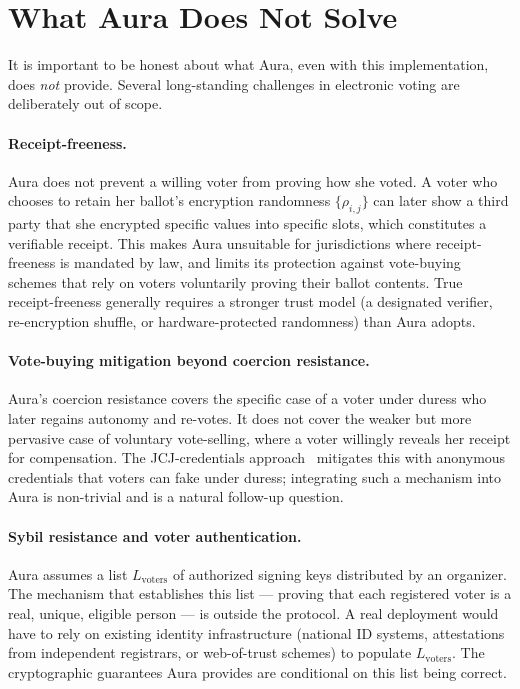 \documentclass[12pt,a4paper,oneside]{report}
\begin{document}
\section{What Aura Does Not Solve}
\label{sec:limits}

It is important to be honest about what Aura, even with this 
implementation, does \emph{not} provide. Several long-standing 
challenges in electronic voting are deliberately out of scope.

\paragraph{Receipt-freeness.} 
Aura does not prevent a willing voter from proving how she voted. A 
voter who chooses to retain her ballot's encryption randomness 
$\{\rho_{i, j}\}$ can later show a third party that she encrypted 
specific values into specific slots, which constitutes a verifiable 
receipt. This makes Aura unsuitable for jurisdictions where 
receipt-freeness is mandated by law, and limits its protection 
against vote-buying schemes that rely on voters voluntarily 
proving their ballot contents. True receipt-freeness 
generally requires a stronger trust model (a designated verifier, 
re-encryption shuffle, or hardware-protected randomness) than Aura 
adopts.

\paragraph{Vote-buying mitigation beyond coercion resistance.} 
Aura's coercion resistance covers the specific case of a voter under 
duress who later regains autonomy and re-votes. It does not cover the 
weaker but more pervasive case of voluntary vote-selling, where a 
voter willingly reveals her receipt for compensation. The 
JCJ-credentials approach~\cite{jcj} mitigates this with anonymous 
credentials that voters can fake under duress; integrating such a 
mechanism into Aura is non-trivial and is a natural follow-up question.

\paragraph{Sybil resistance and voter authentication.} 
Aura assumes a list $L_{\text{voters}}$ of authorized signing keys 
distributed by an organizer. The mechanism that establishes this list 
--- proving that each registered voter is a real, unique, eligible 
person --- is outside the protocol. A real deployment would have to 
rely on existing identity infrastructure (national ID systems, 
attestations from independent registrars, or web-of-trust schemes) 
to populate $L_{\text{voters}}$. The cryptographic guarantees Aura 
provides are conditional on this list being correct.
\end{document}
